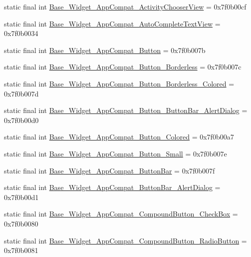 \begin{CompactItemize}
static final int \hyperlink{classandroid_1_1support_1_1v7_1_1recyclerview_1_1_r_1_1style_f919c3313500f2ba2f47947333776368}{Base\_\-Widget\_\-AppCompat\_\-ActivityChooserView} = 0x7f0b00cf
\item 
static final int \hyperlink{classandroid_1_1support_1_1v7_1_1recyclerview_1_1_r_1_1style_613d66f2361ff588e758d1ba0fc1ca99}{Base\_\-Widget\_\-AppCompat\_\-AutoCompleteTextView} = 0x7f0b0034
\item 
static final int \hyperlink{classandroid_1_1support_1_1v7_1_1recyclerview_1_1_r_1_1style_0f981cc00cfa9ec51a52060c7a49fc95}{Base\_\-Widget\_\-AppCompat\_\-Button} = 0x7f0b007b
\item 
static final int \hyperlink{classandroid_1_1support_1_1v7_1_1recyclerview_1_1_r_1_1style_f82c83da07d40b5f69bc3a10b4a8a664}{Base\_\-Widget\_\-AppCompat\_\-Button\_\-Borderless} = 0x7f0b007c
\item 
static final int \hyperlink{classandroid_1_1support_1_1v7_1_1recyclerview_1_1_r_1_1style_9a662a21ab07083df7eb5504a39d3f6a}{Base\_\-Widget\_\-AppCompat\_\-Button\_\-Borderless\_\-Colored} = 0x7f0b007d
\item 
static final int \hyperlink{classandroid_1_1support_1_1v7_1_1recyclerview_1_1_r_1_1style_9a18364c071c0b0d6741d4a13a58c66f}{Base\_\-Widget\_\-AppCompat\_\-Button\_\-ButtonBar\_\-AlertDialog} = 0x7f0b00d0
\item 
static final int \hyperlink{classandroid_1_1support_1_1v7_1_1recyclerview_1_1_r_1_1style_e40ba146967e5a9c0e2813f8fe10c262}{Base\_\-Widget\_\-AppCompat\_\-Button\_\-Colored} = 0x7f0b00a7
\item 
static final int \hyperlink{classandroid_1_1support_1_1v7_1_1recyclerview_1_1_r_1_1style_60a43470e12f3dd803966cd5c4f956c4}{Base\_\-Widget\_\-AppCompat\_\-Button\_\-Small} = 0x7f0b007e
\item 
static final int \hyperlink{classandroid_1_1support_1_1v7_1_1recyclerview_1_1_r_1_1style_95054660dc62896d4390f312506a700a}{Base\_\-Widget\_\-AppCompat\_\-ButtonBar} = 0x7f0b007f
\item 
static final int \hyperlink{classandroid_1_1support_1_1v7_1_1recyclerview_1_1_r_1_1style_f99113c91b50fd826738f4ac1b30e5fa}{Base\_\-Widget\_\-AppCompat\_\-ButtonBar\_\-AlertDialog} = 0x7f0b00d1
\item 
static final int \hyperlink{classandroid_1_1support_1_1v7_1_1recyclerview_1_1_r_1_1style_7e100deb5798816f0ee9337c1fa0791a}{Base\_\-Widget\_\-AppCompat\_\-CompoundButton\_\-CheckBox} = 0x7f0b0080
\item 
static final int \hyperlink{classandroid_1_1support_1_1v7_1_1recyclerview_1_1_r_1_1style_0d23bbc4ba950a5fa17f8054a66df414}{Base\_\-Widget\_\-AppCompat\_\-CompoundButton\_\-RadioButton} = 0x7f0b0081

\end{CompactItemize}
